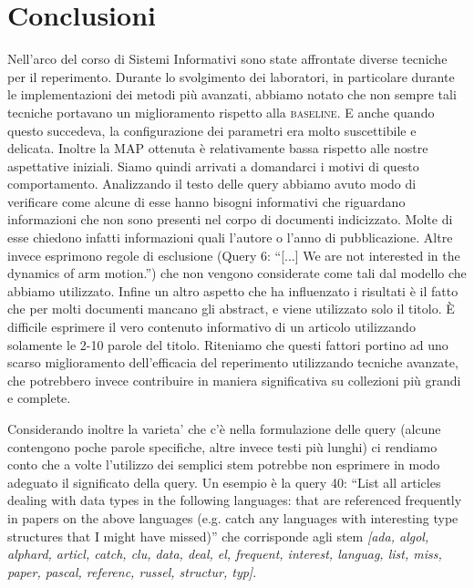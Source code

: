 \documentclass{llncs}
\begin{document}






\section{Conclusioni}
\label{sec:conclusioni}
Nell'arco del corso di Sistemi Informativi sono state affrontate diverse tecniche per il reperimento. Durante lo svolgimento dei laboratori, in particolare durante le implementazioni dei metodi pi\`u avanzati, abbiamo notato che non sempre tali tecniche portavano un miglioramento rispetto alla \textsc{baseline}. E anche quando questo succedeva, la configurazione dei parametri era molto suscettibile e delicata. Inoltre la MAP ottenuta \`e relativamente bassa rispetto alle nostre aspettative iniziali. Siamo quindi arrivati a domandarci i motivi di questo comportamento. Analizzando il testo delle query abbiamo avuto modo di verificare come alcune di esse hanno bisogni informativi che riguardano informazioni che non sono presenti nel corpo di documenti indicizzato. Molte di esse chiedono infatti informazioni quali l'autore o l'anno di pubblicazione. Altre invece esprimono regole di esclusione (Query 6: ``[...] We are not interested in the dynamics of arm motion.'') che non vengono considerate come tali dal modello che abbiamo utilizzato. Infine un altro aspetto che ha influenzato i risultati \`e il fatto che per molti documenti mancano gli abstract, e viene utilizzato solo il titolo. \`E difficile esprimere il vero contenuto informativo di un articolo utilizzando solamente le 2-10 parole del titolo. Riteniamo che questi fattori portino ad uno scarso miglioramento dell'efficacia del reperimento utilizzando tecniche avanzate, che potrebbero invece contribuire in maniera significativa su collezioni pi\`u grandi e complete. 

Considerando inoltre la varieta' che c'\`e nella formulazione delle query (alcune contengono poche parole specifiche, altre invece testi pi\`u lunghi) ci rendiamo conto che a volte l'utilizzo dei semplici stem potrebbe non esprimere in modo adeguato il significato della query. Un esempio \`e la query 40: ``List all articles dealing with data types in the following languages: that are referenced frequently in papers on the above languages (e.g. catch any languages with interesting type structures that I might have missed)'' che corrisponde agli stem \textit{[ada, algol, alphard, articl, catch, clu, data, deal, el, frequent, interest, languag, list, miss, paper, pascal, referenc, russel, structur, typ]}.
\end{document}
